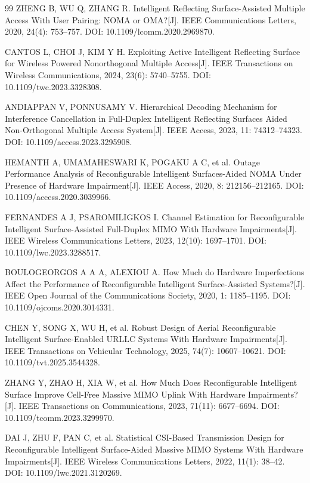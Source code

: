 \begin{thebibliography}{99}
 ZHENG B, WU Q, ZHANG R. Intelligent Reflecting Surface-Assisted Multiple Access With User Pairing: NOMA or OMA?[J]. IEEE Communications Letters, 2020, 24(4): 753--757. DOI: 10.1109/lcomm.2020.2969870.

 CANTOS L, CHOI J, KIM Y H. Exploiting Active Intelligent Reflecting Surface for Wireless Powered Nonorthogonal Multiple Access[J]. IEEE Transactions on Wireless Communications, 2024, 23(6): 5740--5755. DOI: 10.1109/twc.2023.3328308.

 ANDIAPPAN V, PONNUSAMY V. Hierarchical Decoding Mechanism for Interference Cancellation in Full-Duplex Intelligent Reflecting Surfaces Aided Non-Orthogonal Multiple Access System[J]. IEEE Access, 2023, 11: 74312--74323. DOI: 10.1109/access.2023.3295908.

 HEMANTH A, UMAMAHESWARI K, POGAKU A C, et al. Outage Performance Analysis of Reconfigurable Intelligent Surfaces-Aided NOMA Under Presence of Hardware Impairment[J]. IEEE Access, 2020, 8: 212156--212165. DOI: 10.1109/access.2020.3039966.

 FERNANDES A J, PSAROMILIGKOS I. Channel Estimation for Reconfigurable Intelligent Surface-Assisted Full-Duplex MIMO With Hardware Impairments[J]. IEEE Wireless Communications Letters, 2023, 12(10): 1697--1701. DOI: 10.1109/lwc.2023.3288517.

 BOULOGEORGOS A A A, ALEXIOU A. How Much do Hardware Imperfections Affect the Performance of Reconfigurable Intelligent Surface-Assisted Systems?[J]. IEEE Open Journal of the Communications Society, 2020, 1: 1185--1195. DOI: 10.1109/ojcoms.2020.3014331.

 CHEN Y, SONG X, WU H, et al. Robust Design of Aerial Reconfigurable Intelligent Surface-Enabled URLLC Systems With Hardware Impairments[J]. IEEE Transactions on Vehicular Technology, 2025, 74(7): 10607--10621. DOI: 10.1109/tvt.2025.3544328.

 ZHANG Y, ZHAO H, XIA W, et al. How Much Does Reconfigurable Intelligent Surface Improve Cell-Free Massive MIMO Uplink With Hardware Impairments?[J]. IEEE Transactions on Communications, 2023, 71(11): 6677--6694. DOI: 10.1109/tcomm.2023.3299970.

 DAI J, ZHU F, PAN C, et al. Statistical CSI-Based Transmission Design for Reconfigurable Intelligent Surface-Aided Massive MIMO Systems With Hardware Impairments[J]. IEEE Wireless Communications Letters, 2022, 11(1): 38--42. DOI: 10.1109/lwc.2021.3120269.


\end{thebibliography}
